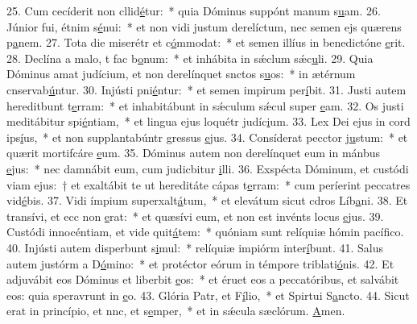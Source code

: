 25. Cum cecíderit non cllid\uline{é}tur:~* quia Dóminus suppónt manum s\uline{u}am.
26. Júnior fui, étnim s\uline{é}nui:~* et non vidi justum derelíctum, nec semen ejs quærens p\uline{a}nem.
27. Tota die miserétr et c\uline{ó}mmodat:~* et semen illíus in benedictóne \uline{e}rit.
28. Declína a malo, t fac b\uline{o}num:~* et inhábita in sǽclum sǽc\uline{u}li.
29. Quia Dóminus amat judícium, et non derelínquet snctos s\uline{u}os:~* in ætérnum cnservab\uline{ú}ntur.
30. Injústi pni\uline{é}ntur:~* et semen impirum per\uline{í}bit.
31. Justi autem hereditbunt t\uline{e}rram:~* et inhabitábunt in sǽculum sǽcul super \uline{e}am.
32. Os justi meditábitur spi\uline{é}ntiam,~* et lingua ejus loquétr judíc\uline{i}um.
33. Lex Dei ejus in cord ips\uline{í}us,~* et non supplantabúntr gressus \uline{e}jus.
34. Consíderat pecctor j\uline{u}stum:~* et quærit mortifcáre \uline{e}um.
35. Dóminus autem non derelínquet eum in mánbus \uline{e}jus:~* nec damnábit eum, cum judicbitur \uline{i}lli.
36. Exspécta Dóminum, et custódi viam ejus:~† et exaltábit te ut hereditáte cápas t\uline{e}rram:~* cum períerint peccatres vid\uline{é}bis.
37. Vidi ímpium superxalt\uline{á}tum,~* et elevátum sicut cdros Líb\uline{a}ni.
38. Et transívi, et ecc non \uline{e}rat:~* et quæsívi eum, et non est invénts locus \uline{e}jus.
39. Custódi innocéntiam, et vide quit\uline{á}tem:~* quóniam sunt relíquiæ hómin pacíf\uline{i}co.
40. Injústi autem disperbunt s\uline{i}mul:~* relíquiæ impiórm inter\uline{í}bunt.
41. Salus autem justórm a D\uline{ó}mino:~* et protéctor eórum in témpore triblati\uline{ó}nis.
42. Et adjuvábit eos Dóminus et liberbit \uline{e}os:~* et éruet eos a peccatóribus, et salvábit eos: quia speravrunt in \uline{e}o.
43. Glória Patr, et F\uline{í}lio,~* et Spirtui S\uline{a}ncto.
44. Sicut erat in princípio, et nnc, et s\uline{e}mper,~* et in sǽcula sæclórum. \uline{A}men.
